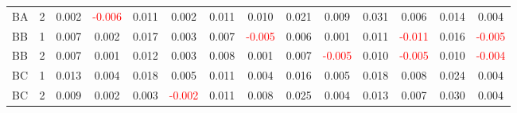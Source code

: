 \begin{table}
{\begin{tabular}{llcccccccccccc}
BA & 2 & 0.002 & \textcolor{red}{-0.006} & 0.011 & 0.002 & 0.011 & 0.010 & 0.021 & 0.009 & 0.031 & 0.006 & 0.014 & 0.004\\
BB & 1 & 0.007 & 0.002 & 0.017 & 0.003 & 0.007 & \textcolor{red}{-0.005} & 0.006 & 0.001 & 0.011 & \textcolor{red}{-0.011} & 0.016 & \textcolor{red}{-0.005}\\
BB & 2 & 0.007 & 0.001 & 0.012 & 0.003 & 0.008 & 0.001 & 0.007 & \textcolor{red}{-0.005} & 0.010 & \textcolor{red}{-0.005} & 0.010 & \textcolor{red}{-0.004}\\
BC & 1 & 0.013 & 0.004 & 0.018 & 0.005 & 0.011 & 0.004 & 0.016 & 0.005 & 0.018 & 0.008 & 0.024 & 0.004\\
BC & 2 & 0.009 & 0.002 & 0.003 & \textcolor{red}{-0.002} & 0.011 & 0.008 & 0.025 & 0.004 & 0.013 & 0.007 & 0.030 & 0.004\\
\hline
    \end{tabular}%
    }
    \label{tab:cen1_sh}
\end{table}

